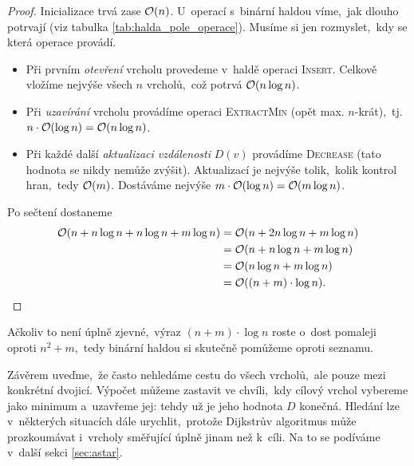 \begin{proof}
    Inicializace trvá zase $\mathcal{O}(n)$. U~operací s~binární haldou víme,~jak dlouho potrvají (viz tabulka \ref{tab:halda_pole_operace}). Musíme si jen rozmyslet,~kdy se která operace provádí.
    \begin{itemize}
        \item Při prvním \emph{otevření} vrcholu provedeme v~haldě operaci \textsc{Insert}. Celkově vložíme nejvýše všech $n$ vrcholů,~což potrvá $\mathcal{O}(n\log n)$.
        \item Při \emph{uzavírání} vrcholu provádíme operaci \textsc{ExtractMin} (opět max. $n$-krát),~tj. $n\cdot\mathcal{O}(\log{n})=\mathcal{O}(n\log{n})$.
        \item Při každé další \emph{aktualizaci vzdálenosti} $D(v)$ provádíme \textsc{Decrease} (tato hodnota se nikdy nemůže zvýšit). Aktualizací je nejvýše tolik,~kolik kontrol hran,~tedy $\mathcal{O}(m)$. Dostáváme nejvýše $m\cdot\mathcal{O}(\log n)=\mathcal{O}(m\log n)$.
    \end{itemize}
    Po sečtení dostaneme
    \begin{align*}
        \mathcal{O}(n+n\log{n}+n\log{n}+m\log{n})&=\mathcal{O}(n+2n\log{n}+m\log{n})\\
        &=\mathcal{O}(n+n\log{n}+m\log{n})\\
        &=\mathcal{O}(n\log{n}+m\log{n})\\
        &=\mathcal{O}((n+m)\cdot\log{n}).
    \end{align*}
\end{proof}
Ačkoliv to není úplně zjevné,~výraz $(n+m)\cdot\log{n}$ roste o~dost pomaleji oproti $n^2+m$,~tedy binární haldou si skutečně pomůžeme oproti seznamu.

Závěrem uveďme,~že často nehledáme cestu do všech vrcholů,~ale pouze mezi konkrétní dvojicí. Výpočet můžeme zastavit ve chvíli,~kdy cílový vrchol vybereme jako minimum a~uzavřeme jej: tehdy už je jeho hodnota $D$ konečná. Hledání lze v~některých situacích dále urychlit,~protože Dijkstrův algoritmus může prozkoumávat i~vrcholy směřující úplně jinam než k~cíli. Na to se podíváme v~další sekci \ref{sec:astar}.
